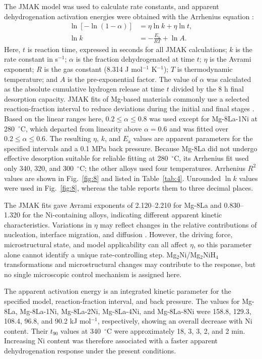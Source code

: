 \documentclass[preprint,12pt]{elsarticle}
\begin{document}
The JMAK model was used to calculate rate constants, and apparent dehydrogenation activation energies were obtained with the Arrhenius equation \cite{ref17,ref18,ref19,ref20}:
\begin{align}
\ln[-\ln(1-\alpha)] &= \eta\ln k+\eta\ln t, \label{eq:5}\\
\ln k &= -\frac{E_{\mathrm{a}}}{RT}+\ln A. \label{eq:6}
\end{align}
Here, $t$ is reaction time, expressed in seconds for all JMAK calculations; $k$ is the rate constant in s$^{-1}$; $\alpha$ is the fraction dehydrogenated at time $t$; $\eta$ is the Avrami exponent; $R$ is the gas constant (8.314 J mol$^{-1}$ K$^{-1}$); $T$ is thermodynamic temperature; and $A$ is the pre-exponential factor. The value of $\alpha$ was calculated as the absolute cumulative hydrogen release at time $t$ divided by the 8 h final desorption capacity. JMAK fits of Mg-based materials commonly use a selected reaction-fraction interval to reduce deviations during the initial and final stages \cite{ref19,ref20}. Based on the linear ranges here, $0.2\leq\alpha\leq0.8$ was used except for Mg-8La-1Ni at 280~$^{\circ}$C, which departed from linearity above $\alpha=0.6$ and was fitted over $0.2\leq\alpha\leq0.6$. The resulting $\eta$, $k$, and $E_{\mathrm{a}}$ values are apparent parameters for the specified intervals and a 0.1 MPa back pressure. Because Mg-8La did not undergo effective desorption suitable for reliable fitting at 280~$^{\circ}$C, its Arrhenius fit used only 340, 320, and 300~$^{\circ}$C; the other alloys used four temperatures. Arrhenius $R^2$ values are shown in Fig.~\ref{fig:8} and listed in Table~\ref{tab:4}. Unrounded $\ln k$ values were used in Fig.~\ref{fig:8}, whereas the table reports them to three decimal places.

The JMAK fits gave Avrami exponents of 2.120--2.210 for Mg-8La and 0.830--1.320 for the Ni-containing alloys, indicating different apparent kinetic characteristics. Variations in $\eta$ may reflect changes in the relative contributions of nucleation, interface migration, and diffusion \cite{ref17,ref18}. However, the driving force, microstructural state, and model applicability can all affect $\eta$, so this parameter alone cannot identify a unique rate-controlling step. Mg$_2$Ni/Mg$_2$NiH$_4$ transformations and microstructural changes may contribute to the response, but no single microscopic control mechanism is assigned here.

The apparent activation energy is an integrated kinetic parameter for the specified model, reaction-fraction interval, and back pressure. The values for Mg-8La, Mg-8La-1Ni, Mg-8La-2Ni, Mg-8La-4Ni, and Mg-8La-8Ni were 158.8, 129.3, 108.4, 96.8, and 90.2 kJ mol$^{-1}$, respectively, showing an overall decrease with Ni content. Their $t_{90}$ values at 340~$^{\circ}$C were approximately 18, 3, 3, 2, and 2 min. Increasing Ni content was therefore associated with a faster apparent dehydrogenation response under the present conditions.
\end{document}
